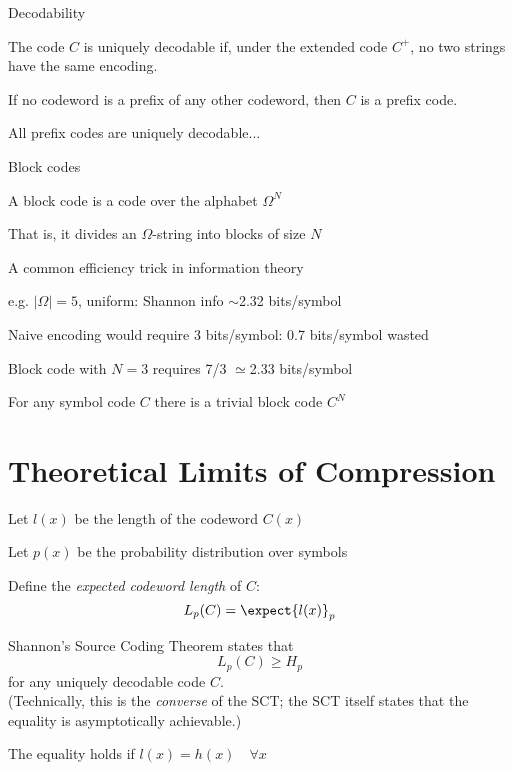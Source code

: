 \documentclass{beamer}
\begin{document}
\begin{frame}{Decodability}

\itemb
\item The code $C$ is \alert{uniquely decodable} if, under the extended code $C^+$,
no two strings have the same encoding.
\item If no codeword is a prefix of any other codeword,
then $C$ is a \alert{prefix code}.
\item All prefix codes are uniquely decodable...
\iteme

\end{frame}

\begin{frame}{Block codes}

\itemb
\item A \alert{block code} is a code over the alphabet $\Omega^N$
\item That is, it divides an $\Omega$-string into blocks of size $N$
\item A common efficiency trick in information theory
 \itemb
 \item e.g. $|\Omega|=5$, uniform: Shannon info $\sim$2.32 bits/symbol
 \item Naive encoding would require 3 bits/symbol: 0.7 bits/symbol wasted
 \item Block code with $N=3$ requires 7/3 $\simeq$2.33 bits/symbol
 \iteme
\item For any symbol code $C$ there is a trivial block code $C^N$
\iteme

\end{frame}

\section{Theoretical Limits of Compression}

\begin{frame}

\itemb
\item Let $l(x)$ be the length of the codeword $C(x)$
\item Let $p(x)$ be the probability distribution over symbols
\item Define the {\em expected codeword length} of $C$:
\[
L_p(C) = \expect{l(x)}_p
\]
\item \alert{Shannon's Source Coding Theorem} states that
\[
L_p(C) \geq H_p
\]
for any uniquely decodable code $C$. \\
(Technically, this is the {\em converse} of the SCT; the SCT itself states that the equality is asymptotically achievable.)
\item The equality holds if $l(x) = h(x) \quad \forall x$
\iteme

\end{frame}
\end{document}
